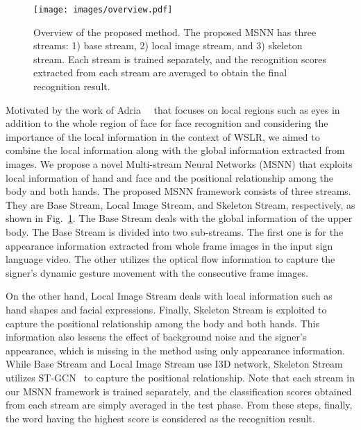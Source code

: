 \documentclass[journal]{IEEEtran}
\begin{document}
\begin{figure}[tb]
  \centering
    \texttt{[image: images/overview.pdf]}
    \caption{Overview of the proposed method.
    The proposed MSNN has three streams: 1) base stream, 2) local image stream, and 3) skeleton stream. Each stream is trained separately, and the recognition scores extracted from each stream are averaged to obtain the final recognition result. }
    \label{fig:overview}
\end{figure}


Motivated by the work of Adria~\etal~\cite{adria2018zoom} that focuses on local regions such as eyes in addition to the whole region of face for face recognition and considering the importance of the local information in the context of WSLR, we aimed to combine the local information along with the global information extracted from images. We propose a novel Multi-stream Neural Networks (MSNN) that exploits local information of hand and face and the positional relationship among the body and both hands. The proposed MSNN framework consists of three streams. They are Base Stream, Local Image Stream, and Skeleton Stream, respectively, as shown in Fig.~\ref{fig:overview}. The Base Stream deals with the global information of the upper body. The Base Stream is divided into two sub-streams. The first one is for the appearance information extracted from whole frame images in the input sign language video. The other utilizes the optical flow information to capture the signer's dynamic gesture movement with the consecutive frame images. 


On the other hand, Local Image Stream deals with local information such as hand shapes and facial expressions. Finally, Skeleton Stream is exploited to capture the positional relationship among the body and both hands. This information also lessens the effect of background noise and the signer's appearance, which is missing in the method using only appearance information. While Base Stream and Local Image Stream use I3D network, Skeleton Stream utilizes ST-GCN~\cite{yan2018stgcn} to capture the positional relationship. Note that each stream in our MSNN framework is trained separately, and the classification
scores obtained from each stream are simply averaged in the test phase. From these steps, finally, the word having the highest score is considered as the recognition result. 
\end{document}
